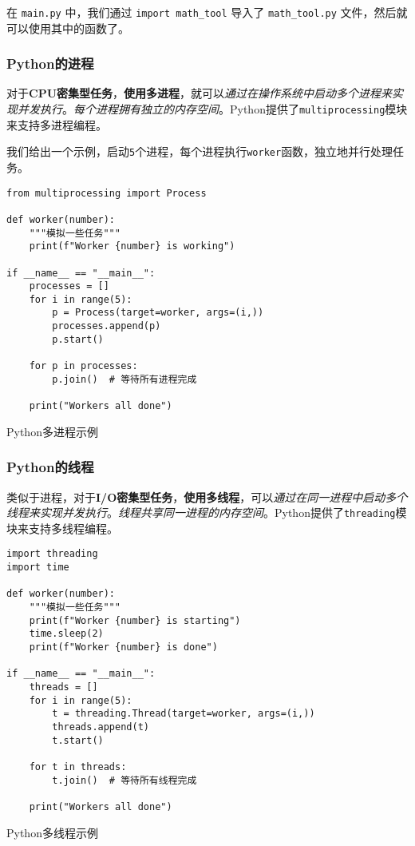 在 \texttt{main.py} 中，我们通过 \texttt{import math\_tool} 导入了 \texttt{math\_tool.py} 文件，然后就可以使用其中的函数了。

\subsubsection{Python的进程}

对于\textbf{CPU密集型任务}，\textbf{使用多进程}，就可以\textit{通过在操作系统中启动多个进程来实现并发执行}。\textit{每个进程拥有独立的内存空间}。Python提供了\texttt{multiprocessing}模块来支持多进程编程。

我们给出一个示例，启动\texttt{5}个进程，每个进程执行\texttt{worker}函数，独立地并行处理任务。

\begin{longlisting}
    \begin{verbatim}
from multiprocessing import Process

def worker(number):
    """模拟一些任务"""
    print(f"Worker {number} is working")

if __name__ == "__main__":
    processes = []
    for i in range(5):
        p = Process(target=worker, args=(i,))
        processes.append(p)
        p.start()

    for p in processes:
        p.join()  # 等待所有进程完成

    print("Workers all done")
    \end{verbatim}
    \caption{Python多进程示例}
    \label{listing:pythonprocess}
\end{longlisting}

\subsubsection{Python的线程}

类似于进程，对于\textbf{I/O密集型任务}，\textbf{使用多线程}，可以\textit{通过在同一进程中启动多个线程来实现并发执行}。\textit{线程共享同一进程的内存空间}。Python提供了\texttt{threading}模块来支持多线程编程。

\begin{longlisting}
    \begin{verbatim}
import threading
import time

def worker(number):
    """模拟一些任务"""
    print(f"Worker {number} is starting")
    time.sleep(2)
    print(f"Worker {number} is done")

if __name__ == "__main__":
    threads = []
    for i in range(5):
        t = threading.Thread(target=worker, args=(i,))
        threads.append(t)
        t.start()

    for t in threads:
        t.join()  # 等待所有线程完成

    print("Workers all done")

    \end{verbatim}
    \caption{Python多线程示例}
    \label{listing:pythonthread}
\end{longlisting}

